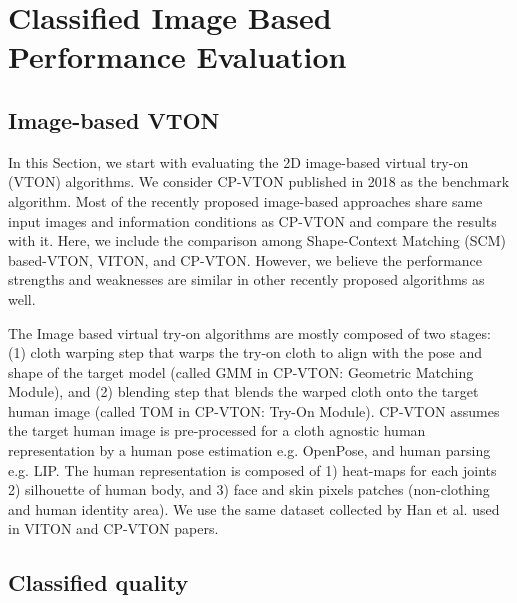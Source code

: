 \section{Classified Image Based Performance Evaluation}  \label{section:classifiedeval}

\subsection{Image-based VTON}

In this Section, we start with evaluating the 2D image-based virtual try-on (VTON) algorithms. We consider CP-VTON\cite{Wang2018TowardCI} published in 2018 as the benchmark algorithm. Most of the recently proposed image-based approaches\cite{Han2017VITONAI,Sun2019ImageBasedVT,Yu_2019_ICCV} share same input images and information conditions as CP-VTON and compare the results with it. Here, we include the comparison among Shape-Context Matching (SCM) based-VTON, VITON\cite{Han2017VITONAI}, and  CP-VTON\cite{Wang2018TowardCI}. However, we believe the performance strengths and weaknesses are similar in other recently proposed algorithms as well.


The Image based virtual try-on algorithms are mostly composed of two stages: (1) cloth warping step that warps the try-on cloth to align with the pose and shape of the target model (called GMM in CP-VTON: Geometric Matching Module)\cite{Wang2018TowardCI}, and (2) blending step that blends the warped cloth onto the target human image (called TOM in CP-VTON: Try-On Module)\cite{Wang2018TowardCI}. CP-VTON\cite{Wang2018TowardCI} assumes the target human image is pre-processed for a cloth agnostic human representation by a human pose estimation e.g. OpenPose\cite{Cao2018OpenPoseRM}, and human parsing e.g. LIP\cite{Liang2018LookIP}. The human representation is composed of 1) heat-maps for each joints 2) silhouette of human body, and 3) face and skin pixels patches (non-clothing and human identity area). We use the same dataset collected by Han et al. used in VITON\cite{Han2017VITONAI} and CP-VTON\cite{Wang2018TowardCI} papers.


\subsection{Classified quality}


